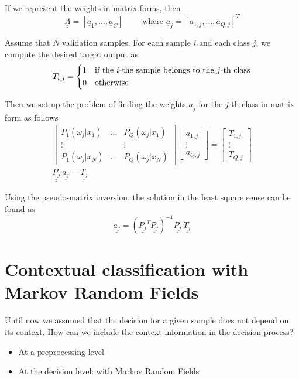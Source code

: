 \documentclass[oneside,onecolumn]{report}
\begin{document}
If we represent the weights in matrix forms, then
$$ \underline{\underline{A}} = \left[ \underline a_1, \dots, \underline a_C \right] \qquad \text{ where } \underline a_j = \left[ a_{1, j}, \dots, a_{Q, j} \right]^T $$

Assume that $N$ validation samples.
For each sample $i$ and each class $j$, we compute the desired target output as
$$ T_{i, j} = \begin{dcases}
    1 & \text{if the $i$-the sample belongs to the $j$-th class} \\
    0 & \text{otherwise}
\end{dcases} $$

Then we set up the problem of finding the weights $\underline a_j$ for the $j$-th class in matrix form as follows
\begin{gather*}
    \begin{bmatrix}
        P_1(\omega_j | x_1) & \dots & P_Q(\omega_j | x_1) \\
        \vdots &  & \vdots \\
        P_1(\omega_j | x_N) & \dots & P_Q(\omega_j | x_N)
    \end{bmatrix}
    \begin{bmatrix}
        a_{1, j} \\
        \vdots \\
        a_{Q, j}
    \end{bmatrix}
    =
    \begin{bmatrix}
        T_{1, j} \\
        \vdots \\
        T_{Q, j}
    \end{bmatrix} \\
    \underline{\underline{P_j}}
    \ \underline{a_j}
    =
    \underline{T_j}
\end{gather*}

Using the pseudo-matrix inversion, the solution in the least square sense can be found as
$$ \underline{a_j} = \left( \underline{\underline{P_j}}^T \underline{\underline{P_j}} \right)^{-1} \underline{\underline{P_j}} \ \underline{T_j} $$




\section{Contextual classification with Markov Random Fields}
Until now we assumed that the decision for a given sample does not depend on its context.
How can we include the context information in the decision process?
\begin{itemize}
    \item At a preprocessing level
    \item At the decision level: with Markov Random Fields
\end{itemize}
\end{document}
